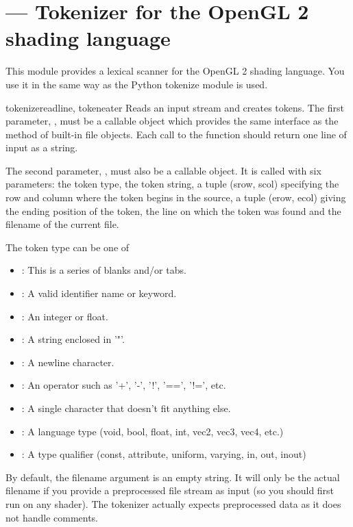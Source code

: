 \section{ ---
          Tokenizer for the OpenGL 2 shading language}


This module provides a lexical scanner for the OpenGL 2 shading language.
You use it in the same way as the Python tokenize module is used.

\begin{funcdesc}{tokenize}{readline, tokeneater}
Reads an input stream and creates tokens. The first parameter,
, must be a callable object which provides the same interface
as the  method of built-in file objects. Each call to the
function should return one line of input as a string.

The second parameter, , must also be a callable
object. It is called with six parameters: the token type, the token
string, a tuple (srow, scol) specifying the row and column where the
token begins in the source, a tuple (erow, ecol) giving the ending
position of the token, the line on which the token was found and the
filename of the current file.

The token type can be one of 

\begin{itemize}
\item {}: This is a series of blanks and/or tabs. 
\item {}: A valid identifier name or keyword. 
\item {}: An integer or float. 
\item {}: A string enclosed in '"'. 
\item {}: A newline character. 
\item {}: An operator such as '+', '-', '!', '==', '!=', etc. 
\item {}: A single character that doesn't fit anything else. 
\item {}: A language type (void, bool, float, int, vec2, vec3, vec4, etc.)
\item {}: A type qualifier (const, attribute, uniform, varying, in, out, inout)
\end{itemize}

By default, the filename argument is an empty string. It will only be
the actual filename if you provide a preprocessed file stream as input
(so you should first run  on any shader). The tokenizer
actually expects preprocessed data as it does not handle comments.
\end{funcdesc}
